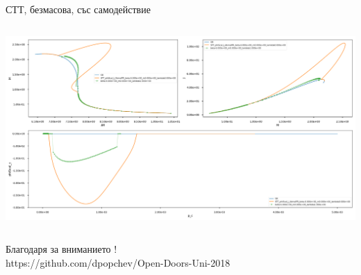 \documentclass[10pt,a4paper]{beamer}
\begin{document}
        \begin{frame}{ СТТ, безмасова, със самодействие }
            \begin{columns}
                \begin{column}{\textwidth}
                    \includegraphics[width=\textwidth]{images/STT_beta-6_m0_lambda1.png}
                \end{column}
            \end{columns}
        \end{frame}
        
	\begin{frame}
		\begin{center} 
            {\Huge Благодаря за вниманието ! } \\[5mm]
            {\small https://github.com/dpopchev/Open-Doors-Uni-2018 }
        \end{center}
	\end{frame}
	
\end{document}
